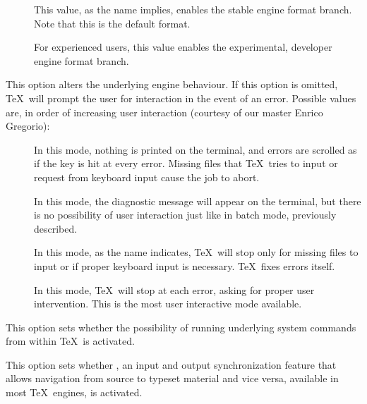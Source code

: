\begin{description}
\begin{description}
\begin{description}
\item[] This value, as the name implies, enables the stable engine format branch. Note that this is the default format.

\item[] For experienced users, this value enables the experimental, developer engine format branch.
\end{description}

\item[\abox{interaction}] This option alters the underlying engine behaviour. If this option is omitted, \TeX\ will prompt the user for interaction in the event of an error. Possible values are, in order of increasing user interaction (courtesy of our master Enrico Gregorio):

\begin{description}
\item[] In this mode, nothing is printed on the terminal, and errors are scrolled as if the  key is hit at every error. Missing files that \TeX\ tries to input or request from keyboard input cause the job to abort.

\item[] In this mode, the diagnostic message will appear on the terminal, but there is no possibility of user interaction just like in batch mode, previously described.

\item[] In this mode, as the name indicates, \TeX\ will stop only for missing files to input or if proper keyboard input is necessary. \TeX\ fixes errors itself.

\item[] In this mode, \TeX\ will stop at each error, asking for proper user intervention. This is the most user interactive mode available.
\end{description}

\item[\rpsbox{shell}] This option sets whether the possibility of running underlying system commands from within \TeX\ is activated.

\item[\rpsbox{synctex}] This option sets whether , an input and output synchronization feature that allows navigation from source to typeset material and vice versa, available in most \TeX\ engines, is activated.


\end{description}
\end{description}
